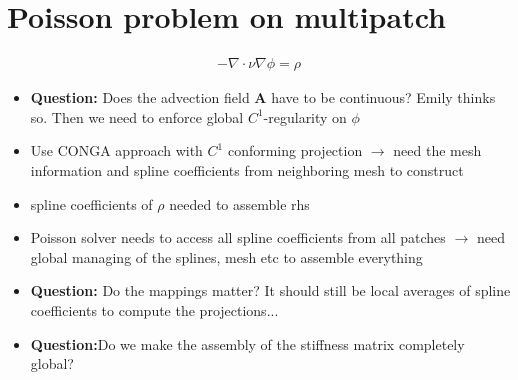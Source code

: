 \documentclass[presentation.tex]{subfiles}
\begin{document}
\section*{Poisson problem on multipatch}
\begin{align*}
    -\nabla \cdot \nu \nabla \phi = \rho
\end{align*}
\begin{itemize}
    \item \textbf{Question:} Does the advection field $\mathbf{A}$ have to be
            continuous? Emily thinks so. Then we need to enforce global $C^1$-regularity on $\phi$ 
    \item Use CONGA approach with $C^1$ conforming projection $\rightarrow$ 
            need the mesh information and spline coefficients from neighboring mesh
            to construct 
    \item spline coefficients of $\rho$ needed to assemble rhs
    \item Poisson solver needs to access all spline coefficients from all patches
            $\rightarrow$ need global managing of the splines, mesh etc 
            to assemble everything
    \item \textbf{Question:} Do the mappings matter? It should still be local 
            averages of spline coefficients to compute the projections...
    \item \textbf{Question:}Do we make the assembly of the stiffness matrix completely global?
\end{itemize}
\end{document}
